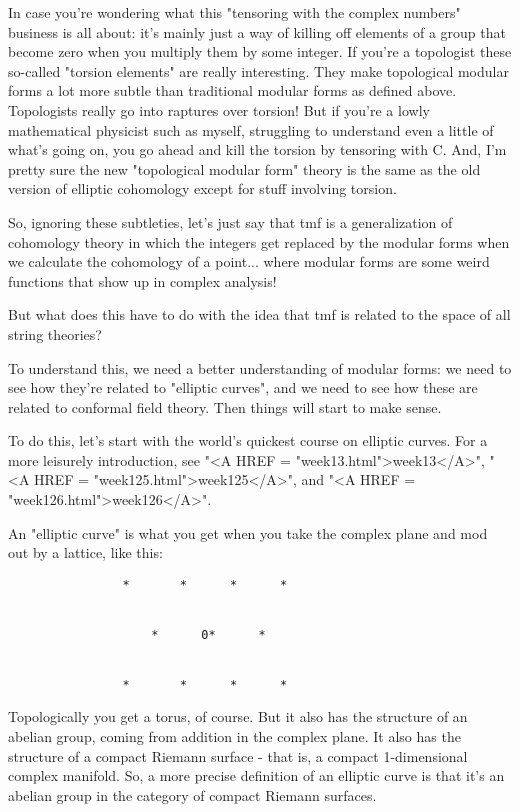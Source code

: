 In case you're wondering what this "tensoring with the complex 
numbers" business is all about: it's mainly just a way of killing 
off elements of a group that become zero when you multiply them by 
some integer.  If you're a topologist these so-called "torsion 
elements" are really interesting.  They make topological modular
forms a lot more subtle than traditional modular forms as defined 
above.  Topologists really go into raptures over torsion!  But if 
you're a lowly mathematical physicist such as myself, struggling to 
understand even a little of what's going on, you go ahead and kill 
the torsion by tensoring with C.  And, I'm pretty sure the new
"topological modular form" theory is the same as the old version
of elliptic cohomology except for stuff involving torsion.

So, ignoring these subtleties, let's just say that tmf is a 
generalization of cohomology theory in which the integers get 
replaced by the modular forms when we calculate the cohomology 
of a point... where modular forms are some weird functions that 
show up in complex analysis! 

But what does this have to do with the idea that tmf is related
to the space of all string theories?

To understand this, we need a better understanding of modular forms: 
we need to see how they're related to "elliptic curves", 
and we need to see how these are related to conformal field theory.  
Then things will start to make sense.    

To do this, let's start with the world's quickest course on 
elliptic curves.  For a more leisurely introduction, see "<A HREF = "week13.html">week13</A>", 
"<A HREF = "week125.html">week125</A>", and "<A HREF = "week126.html">week126</A>".

An "elliptic curve" is what you get when you take the
complex plane and mod out by a lattice, like this:

                  
\begin{verbatim}
                *       *      *      *

                             
                    *      0*      *                


                *       *      *      *
\end{verbatim}
    
Topologically you get a torus, of course.  But it also
has the structure of an abelian group, coming from addition
in the complex plane.  It also has the structure of a compact
Riemann surface - that is, a compact 1-dimensional complex manifold. 
So, a more precise definition of an elliptic curve is that it's 
an abelian group in the category of compact Riemann surfaces.

